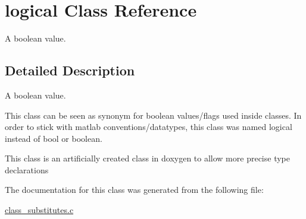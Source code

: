 \hypertarget{classlogical}{\section{logical Class Reference}
\label{classlogical}
}


A boolean value.  




\subsection{Detailed Description}
A boolean value. 

This class can be seen as synonym for boolean values/flags used inside classes. In order to stick with matlab conventions/datatypes, this class was named logical instead of bool or boolean.

This class is an artificially created class in doxygen to allow more precise type declarations 

The documentation for this class was generated from the following file\-:\begin{DoxyCompactItemize}
\item 
\hyperlink{class__substitutes_8c}{class\-\_\-substitutes.\-c}\end{DoxyCompactItemize}
